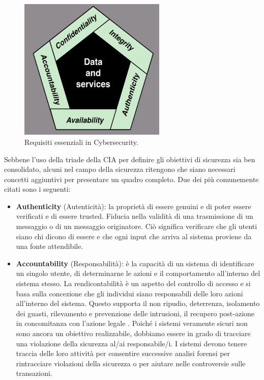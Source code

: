 \begin{figure}[H]
    \centering
    \includegraphics[width=7cm, keepaspectratio]{capitoli/cap_1/imgs/cia.png}
    \caption{Requisiti essenziali in Cybersecurity.}\label{fig:cia}
\end{figure}

Sebbene l'uso della triade della CIA per definire gli obiettivi di sicurezza sia ben consolidato,
alcuni nel campo della sicurezza ritengono che siano necessari concetti aggiuntivi per presentare
un quadro completo. Due dei più comunemente citati sono i seguenti:
\begin{itemize}
    \item \textbf{Authenticity} (Autenticità): la proprietà di essere genuini e di poter essere verificati e di essere trusted. Fiducia nella validità di una trasmissione di un messaggio o di un messaggio originatore. Ciò significa verificare che gli utenti siano chi dicono di essere e che ogni input che arriva al sistema proviene da una fonte attendibile.
    \item \textbf{Accountability} (Responsabilità): è la capacità di un sistema di identificare un singolo utente, di determinarne le azioni e il comportamento all'interno del sistema stesso. La rendicontabilità è un aspetto del controllo di accesso e si basa sulla concezione che gli individui siano responsabili delle loro azioni all'interno del sistema. Questo supporta il non ripudio, deterrenza, isolamento dei guasti, rilevamento e prevenzione delle intrusioni, il recupero post-azione in concomitanza con l'azione legale . Poiché i sistemi veramente sicuri non sono ancora un obiettivo realizzabile, dobbiamo essere in grado di tracciare una violazione della sicurezza al/ai responsabile/i. I sistemi devono tenere traccia delle loro attività per consentire successive analisi forensi per rintracciare violazioni della sicurezza o per aiutare nelle controversie sulle transazioni.
\end{itemize}

